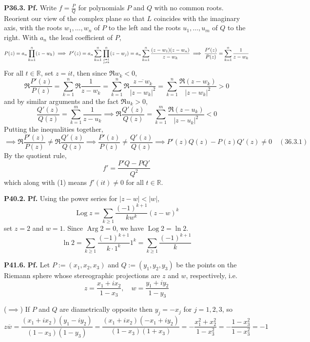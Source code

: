 \documentclass{article}
\def\mbb#1{\mathbb{#1}}
\def\tbf#1{\textbf{#1}}
\def\bR{\mbb{R}}
\newcommand{\pf}{\tbf{Pf. }}
\newcommand{\imp}{\implies}
\newcommand{\sep}[1][.5cm]{\vspace{#1}}
\renewcommand{\bar}{\overline}
\DeclareMathOperator{\Arg}{Arg}
\DeclareMathOperator{\Log}{Log}
\begin{document}
\tbf{P36.3.} \pf Write $f=\frac PQ$ for polynomials $P$ and $Q$ with no common roots. Reorient our view of the complex plane so that $L$ coincides with the imaginary axis, with the roots $w_1,\dots,w_n$ of $P$ to the left and the roots $u_1,\dots,u_m$ of $Q$ to the right. With $a_n$ the lead coefficient of $P$,
$$P(z) = a_n\prod_{k=1}^n (z-w_k)
\imp P'(z) = a_n\sum_{k=1}^n\prod_{j=1\atop j\ne k}^n(z-w_j)
= a_n\sum_{k=1}^n\frac{(z-w_1)(z-w_n)}{z-w_k}
\imp \frac{P'(z)}{P(z)} = \sum_{k=1}^n\frac{1}{z-w_k}$$
For all $t\in\bR$, set $z=it$, then since $\Re w_k<0$,
$$\Re \frac{P'(z)}{P(z)} = \sum_{k=1}^n \Re\frac1{z-w_k}
= \sum_{k=1}^n \Re\frac{\bar{z-w_k}}{|z-w_k|^2}
= \sum_{k=1}^n\frac{\Re(z-w_k)}{|z-w_k|^2}
> 0$$
and by similar arguments and the fact $\Re u_k>0$,
$$\frac{Q'(z)}{Q(z)} = \sum_{k=1}^m\frac1{z-u_k}
\imp \Re\frac{Q'(z)}{Q(z)} = \sum_{k=1}^m\frac{\Re(z-u_k)}{|z-u_k|^2}
< 0$$
Putting the inequalities together,
$$\imp \Re \frac{P'(z)}{P(z)} \ne \Re\frac{Q'(z)}{Q(z)}
\imp \frac{P'(z)}{P(z)} \ne \frac{Q'(z)}{Q(z)}
\imp P'(z)Q(z)-P(z)Q'(z) \ne 0\quad (36.3.1)$$
By the quotient rule,
$$f'=\frac{P'Q-PQ'}{Q^2}$$
which along with (1) means $f'(it)\ne0$ for all $t\in\bR$.
\sep



\tbf{P40.2.} \pf Using the power series for $|z-w|<|w|$,
$$\Log z = \sum_{k\ge1}\frac{(-1)^{k+1}}{kw^k}(z-w)^k$$
set $z=2$ and $w=1$. Since $\Arg 2=0$, we have $\Log 2=\ln 2$.
$$\ln 2 = \sum_{k\ge1}\frac{(-1)^{k+1}}{k\cdot 1^k}1^k = \sum_{k\ge1}\frac{(-1)^{k+1}}{k}$$
\sep



\tbf{P41.6.} \pf Let $P:=(x_1,x_2,x_3)$ and $Q:=(y_1,y_2,y_3)$ be the points on the Riemann sphere whose stereographic projections are $z$ and $w$, respectively, i.e.
$$z = \frac{x_1+ix_2}{1-x_3},
\quad w = \frac{y_1+iy_2}{1-y_3}$$

($\imp$) If $P$ and $Q$ are diametrically opposite then $y_j=-x_j$ for $j=1,2,3$, so
$$z\bar w = \frac{(x_1+ix_2)(y_1-iy_2)}{(1-x_3)(1-y_3)}
= \frac{(x_1+ix_2)(-x_1+iy_2)}{(1-x_3)(1+x_3)}
= -\frac{x_1^2+x_2^2}{1-x_3^2}
= -\frac{1-x_3^2}{1-x_3^2}
= -1$$
\end{document}
